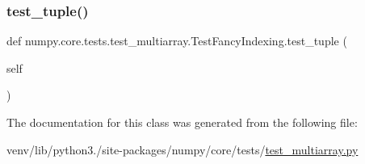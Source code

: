 \subsubsection{\texorpdfstring{test\+\_\+tuple()}{test\_tuple()}}
{\footnotesize\ttfamily def numpy.\+core.\+tests.\+test\+\_\+multiarray.\+Test\+Fancy\+Indexing.\+test\+\_\+tuple (\begin{DoxyParamCaption}\item[{}]{self }\end{DoxyParamCaption})}



The documentation for this class was generated from the following file\+:\begin{DoxyCompactItemize}
\item 
venv/lib/python3./site-\/packages/numpy/core/tests/\hyperlink{core_2tests_2test__multiarray_8py}{test\+\_\+multiarray.\+py}\end{DoxyCompactItemize}

